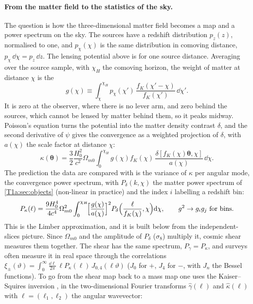 \paragraph{From the matter field to the statistics of the sky.}
The question is how the three-dimensional matter field becomes a map and a power spectrum on the sky. The sources have a redshift distribution $p_z(z)$, normalised to one, and $p_\chi(\chi)$ is the same distribution in comoving distance, $p_\chi\,\dd\chi=p_z\,\dd z$. The lensing potential above is for one source distance. Averaging over the source sample, with $\chi_H$ the comoving horizon, the weight of matter at distance $\chi$ is the 
\begin{equation*}
g(\chi)\equiv\int_\chi^{\chi_H}\!p_\chi(\chi')\,\frac{f_K(\chi'-\chi)}{f_K(\chi')}\,\dd\chi'.
\end{equation*}
It is zero at the observer, where there is no lever arm, and zero behind the sources, which cannot be lensed by matter behind them, so it peaks midway. Poisson's equation turns the potential into the matter density contrast $\delta$, and the second derivative of $\psi$ gives the convergence as a weighted projection of $\delta$, with $a(\chi)$ the scale factor at distance $\chi$:
\begin{equation*}
\kappa(\bm\theta)=\frac32\frac{H_0^2}{c^2}\Omega_{m0}\int_0^{\chi_H}\!g(\chi)f_K(\chi)\,\frac{\delta[f_K(\chi)\bm\theta,\chi]}{a(\chi)}\,\dd\chi .
\end{equation*}
The prediction the data are compared with is the variance of $\kappa$ per angular mode, the convergence power spectrum, with $P_\delta(k,\chi)$ the matter power spectrum of \cref{T1a:sec:objects} (non-linear in practice) and the index $i$ labelling a redshift bin:
\begin{equation*}
P_\kappa(\ell)=\frac{9H_0^4}{4c^4}\Omega_{m0}^2\int_0^{\chi_H}\!\Bigl[\frac{g(\chi)}{a(\chi)}\Bigr]^2P_\delta\Bigl(\frac{\ell}{f_K(\chi)},\chi\Bigr)\mathrm{d}\chi,
\qquad g^2\to g_ig_j\ \text{for bins}.
\end{equation*}
This is the Limber approximation, and it is built below from the independent-slices picture. Since $\Omega_{m0}$ and the amplitude of $P_\delta$ ($\sigma_8$) multiply it, cosmic shear measures them together. The shear has the same spectrum, $P_\gamma=P_\kappa$, and surveys often measure it in real space through the correlations $\xi_\pm(\vartheta)=\int_0^\infty\frac{\dd\ell}{2\pi}\,\ell P_\kappa(\ell)\,J_{0,4}(\ell\vartheta)$ ($J_0$ for $+$, $J_4$ for $-$, with $J_n$ the Bessel functions). To go from the shear map back to a mass map one uses the Kaiser--Squires inversion \cite{KaiserSquires1993}, in the two-dimensional Fourier transforms $\hat\gamma(\bm\ell)$ and $\hat\kappa(\bm\ell)$ with $\bm\ell=(\ell_1,\ell_2)$ the angular wavevector:
